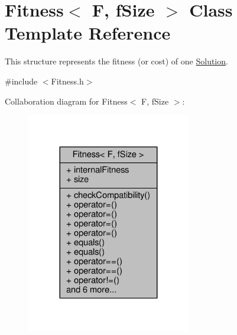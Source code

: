 \hypertarget{structFitness}{}\section{Fitness$<$ F, f\+Size $>$ Class Template Reference}
\label{structFitness}


This structure represents the fitness (or cost) of one \hyperlink{classSolution}{Solution}.  




{\ttfamily \#include $<$Fitness.\+h$>$}



Collaboration diagram for Fitness$<$ F, f\+Size $>$\+:\nopagebreak
\begin{figure}[H]
\begin{center}
\leavevmode
\includegraphics[width=203pt]{structFitness__coll__graph}
\end{center}
\end{figure}

